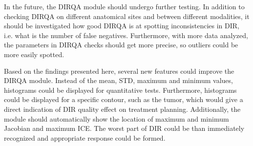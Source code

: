 In the future, the DIRQA module should undergo further testing. In addition to checking DIRQA on different anatomical sites and between different modalities, 
it should be investigated how good DIRQA is at spotting inconsistencies in DIR, i.e. what is the number of false negatives. Furthermore, with more
data analyzed, the parameters in DIRQA checks should get more precise, so outliers could be more easily spotted.

Based on the findings presented here, several new features could improve the DIRQA module. Instead of the mean, STD, maximum and minimum values, histograms could be displayed for quantitative tests.
Furthermore, histograms could be displayed for a specific contour, such as the tumor, which would give a direct indication of DIR quality effect on treatment planning. 
Additionally, the module should automatically show the location of maximum and minimum Jacobian and maximum ICE.
The worst part of DIR could be than immediately recognized and appropriate response could be formed.  
